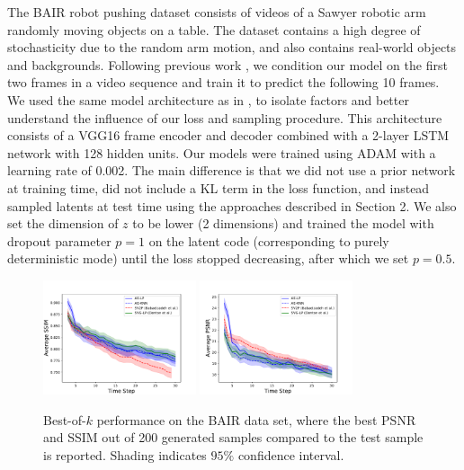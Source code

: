 \documentclass{article}
\begin{document}
The BAIR robot pushing dataset \citep{Ebert17} consists of videos of a Sawyer robotic arm randomly moving objects on a table.
The dataset contains a high degree of stochasticity due to the random arm motion, and also contains real-world objects and backgrounds.
Following previous work \citep{Babaeizadeh2018, Denton2018}, we condition our model on the first two frames in a video sequence and train it to predict the following 10 frames.
We used the same model architecture as in \citep{Denton2018}, to isolate factors and better understand the influence of our loss and sampling procedure.
This architecture consists of a VGG16 frame encoder and decoder combined with a 2-layer LSTM network with 128 hidden units.
Our models were trained using ADAM \citep{ADAM} with a learning rate of 0.002.
The main difference is that we did not use a prior network at training time, did not include a KL term in the loss function, and instead sampled latents at test time using the approaches described in Section 2.
We also set the dimension of $z$ to be lower (2 dimensions) and trained the model with dropout parameter $p=1$ on the latent code (corresponding to purely deterministic mode) until the loss stopped decreasing, after which we set $p=0.5$.

\begin{figure}
  \centering
  \includegraphics[width=0.4\textwidth]{images/bair_ssim.pdf}
  \includegraphics[width=0.4\textwidth]{images/bair_psnr.pdf}
  \caption{Best-of-$k$ performance on the BAIR data set, where the best PSNR and SSIM out of 200 generated samples compared to the test sample is reported. Shading indicates $95\%$ confidence interval. }
  \label{bair}
\end{figure}
\end{document}
